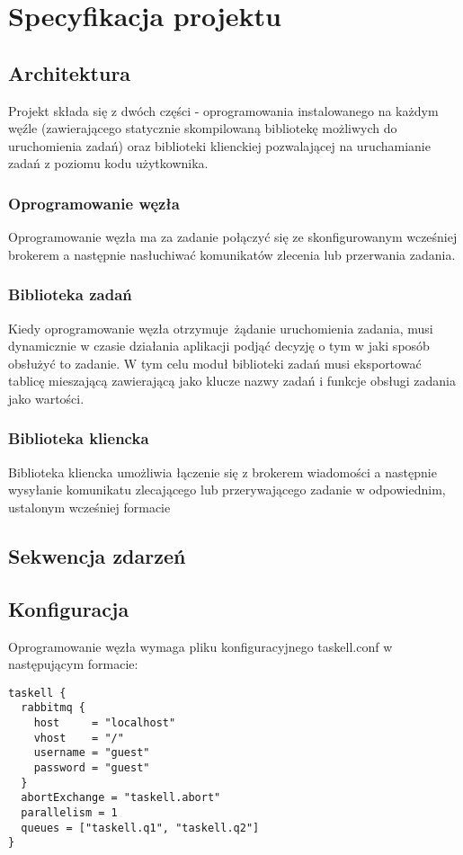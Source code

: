 \chapter{Specyfikacja projektu}
\label{cha:specyfikacjaProjektu}

\section{Architektura}
\label{sec:architektura}
Projekt składa się z dwóch części - oprogramowania instalowanego na każdym węźle (zawierającego statycznie skompilowaną bibliotekę możliwych do uruchomienia zadań) oraz biblioteki klienckiej pozwalającej na uruchamianie zadań z poziomu kodu użytkownika. 

\subsection{Oprogramowanie węzła}
\label{ssec:taskell-node}
Oprogramowanie węzła ma za zadanie połączyć się ze skonfigurowanym wcześniej brokerem a następnie nasłuchiwać komunikatów zlecenia lub przerwania zadania.

\subsection{Biblioteka zadań}
\label{ssec:task-library}
Kiedy oprogramowanie węzła otrzymuje żądanie uruchomienia zadania, musi dynamicznie w czasie działania aplikacji podjąć decyzję o tym w jaki sposób obsłużyć to zadanie. W tym celu moduł biblioteki zadań musi eksportować tablicę mieszającą zawierającą jako klucze nazwy zadań i funkcje obsługi zadania jako wartości. 

\subsection{Biblioteka kliencka}
\label{ssec:taskell-api}
Biblioteka kliencka umożliwia łączenie się z brokerem wiadomości a następnie wysyłanie komunikatu zlecającego lub przerywającego zadanie w odpowiednim, ustalonym wcześniej formacie
\section{Sekwencja zdarzeń}
\label{sec:sekwencja}

\section{Konfiguracja}
\label{sec:konfiguracja}
Oprogramowanie węzła wymaga pliku konfiguracyjnego taskell.conf w następującym formacie:
\begin{verbatim}
taskell {
  rabbitmq {
    host     = "localhost"
    vhost    = "/"
    username = "guest"
    password = "guest"
  }
  abortExchange = "taskell.abort"
  parallelism = 1
  queues = ["taskell.q1", "taskell.q2"]
}
\end{verbatim}


